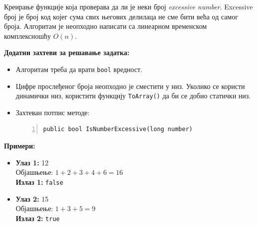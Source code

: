 Креирање функције која проверава да ли је неки број \textit{excessive number}. Excessive број је број код којег сума свих његових делилаца не сме бити већа од самог броја. Алгоритам је неопходно написати са линеарном временском комплексношћу $O(n)$.

\textbf{Додатни захтеви за решавање задатка:}
\begin{itemize}
    \item Алгоритам треба да врати \texttt{bool} вредност.
    \item Цифре прослеђеног броја неопходно је сместити у низ. Уколико се користи динамички низ, користити функцију \texttt{ToArray()} да би се добио статички низ.
    \item Захтеван потпис методе:
    \begin{Verbatim}[fontsize=\footnotesize, numbers=left, xleftmargin=10mm]
public bool IsNumberExcessive(long number)
    \end{Verbatim}
\end{itemize}

\textbf{Примери:}
\begin{itemize}
    \item \textbf{Улаз 1:} 12 \\
          Објашњење: $1 + 2 + 3 + 4 + 6 = 16$ \\
          \textbf{Излаз 1:} \texttt{false}
    \item \textbf{Улаз 2:} 15 \\
          Објашњење: $1 + 3 + 5 = 9$ \\
          \textbf{Излаз 2:} \texttt{true}
\end{itemize}

